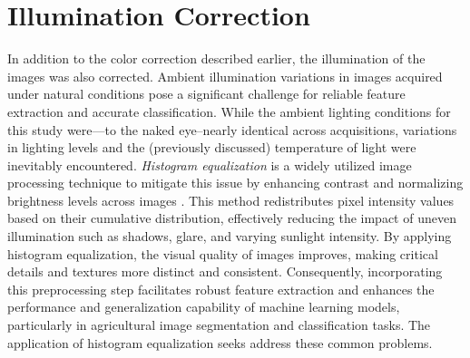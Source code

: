 \documentclass[letterpaper, notitlepage]{report}
\begin{document}

\section{Illumination Correction}
In addition to the color correction described earlier, the illumination of the images was also corrected. Ambient illumination variations in images acquired under natural conditions pose a significant challenge for reliable feature extraction and accurate classification. While the ambient lighting conditions for this study were---to the naked eye--nearly identical across acquisitions, variations in lighting levels and the (previously discussed) temperature of light were inevitably encountered. \textit{Histogram equalization} is a widely utilized image processing technique to mitigate this issue by enhancing contrast and normalizing brightness levels across images \parencite[p.~75]{Nixon2012-ta}. This method redistributes pixel intensity values based on their cumulative distribution, effectively reducing the impact of uneven illumination such as shadows, glare, and varying sunlight intensity. By applying histogram equalization, the visual quality of images improves, making critical details and textures more distinct and consistent. Consequently, incorporating this preprocessing step facilitates robust feature extraction and enhances the performance and generalization capability of machine learning models, particularly in agricultural image segmentation and classification tasks. The application of histogram equalization seeks address these common problems.
\end{document}

